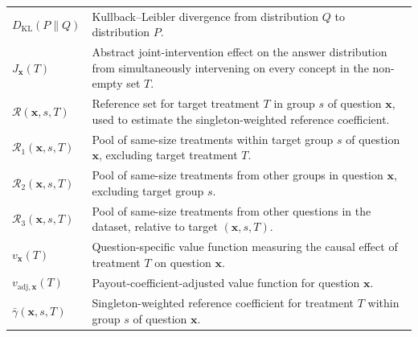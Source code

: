 \begin{longtable}{@{}>{\raggedright\arraybackslash}p{} p{}@{}}
	\hline
	$D_{\mathrm{KL}}(P\|Q)$                            & Kullback--Leibler divergence from distribution $Q$ to distribution $P$.                                                                                                                                            \\
	$J_{\mathbf{x}}(T)$                                & Abstract joint-intervention effect on the answer distribution from simultaneously intervening on every concept in the non-empty set $T$.                                                                           \\
	$\mathcal{R}(\mathbf{x},s,T)$                      & Reference set for target treatment $T$ in group $s$ of question $\mathbf{x}$, used to estimate the singleton-weighted reference coefficient.                                                                       \\
	$\mathcal{R}_1(\mathbf{x},s,T)$                    & Pool of same-size treatments within target group $s$ of question $\mathbf{x}$, excluding target treatment $T$.                                                                                                     \\
	$\mathcal{R}_2(\mathbf{x},s,T)$                    & Pool of same-size treatments from other groups in question $\mathbf{x}$, excluding target group $s$.                                                                                                               \\
	$\mathcal{R}_3(\mathbf{x},s,T)$                    & Pool of same-size treatments from other questions in the dataset, relative to target $(\mathbf{x},s,T)$.                                                                                                           \\
	$v_{\mathbf{x}}(T)$                                & Question-specific value function measuring the causal effect of treatment $T$ on question $\mathbf{x}$.                                                                                                            \\
	$v_{\mathrm{adj},\mathbf{x}}(T)$                   & Payout-coefficient-adjusted value function for question $\mathbf{x}$.                                                                                                                                              \\
	$\bar{\gamma}(\mathbf{x},s,T)$                     & Singleton-weighted reference coefficient for treatment $T$ within group $s$ of question $\mathbf{x}$.                                                                                                              \\

\end{longtable}
